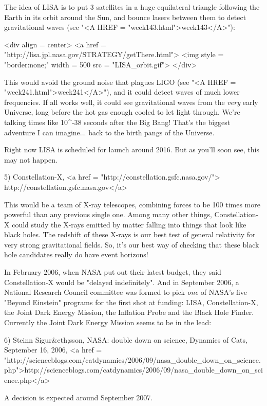 The idea of LISA is to put 3 satellites in a huge equilateral triangle
following the Earth in its orbit around the Sun, and bounce lasers
between them to detect gravitational waves (see "<A HREF =
"week143.html">week143</A>"):

<div align = center>
<a href = "http://lisa.jpl.nasa.gov/STRATEGY/getThere.html">
<img style = "border:none;" width = 500 src = "LISA_orbit.gif">
</div>

This would avoid the ground noise that plagues LIGO (see "<A HREF
= "week241.html">week241</A>"), and it could detect waves of much
lower frequencies.  If all works well, it could see gravitational
waves from the \emph{very} early Universe, long before the hot gas enough
cooled to let light through.  We're talking times like 10^{-38}
seconds after the Big Bang!  That's the biggest adventure I can
imagine... back to the birth pangs of the Universe.

Right now LISA is scheduled for launch around 2016.  But as you'll soon
see, this may not happen.


5) Constellation-X, <a href = "http://constellation.gsfc.nasa.gov/">
http://constellation.gsfc.nasa.gov</a>

This would be a team of X-ray telescopes, combining forces to be 100
times more powerful than any previous single one.  Among many other things,
Constellation-X could study the X-rays emitted by matter falling into things 
that look like black holes.  The redshift of these X-rays is our best test 
of general relativity for very strong gravitational fields.  So, it's our
best way of checking that these black hole candidates really do have event 
horizons!

In February 2006, when NASA put out their latest budget, they said
Constellation-X would be "delayed indefinitely".  And in
September 2006, a National Research Council committee was formed to
pick \emph{one} of NASA's five "Beyond Einstein" programs
for the first shot at funding: LISA, Constellation-X, the Joint Dark
Energy Mission, the Inflation Probe and the Black Hole Finder.
Currently the Joint Dark Energy Mission seems to be in the lead:

6) Steinn Sigur&eth;sson, NASA: double down on science, Dynamics of
Cats, September 16, 2006, <a href = "http://scienceblogs.com/catdynamics/2006/09/nasa_double_down_on_science.php">http://scienceblogs.com/catdynamics/2006/09/nasa_double_down_on_science.php</a>

A decision is expected around September 2007.

